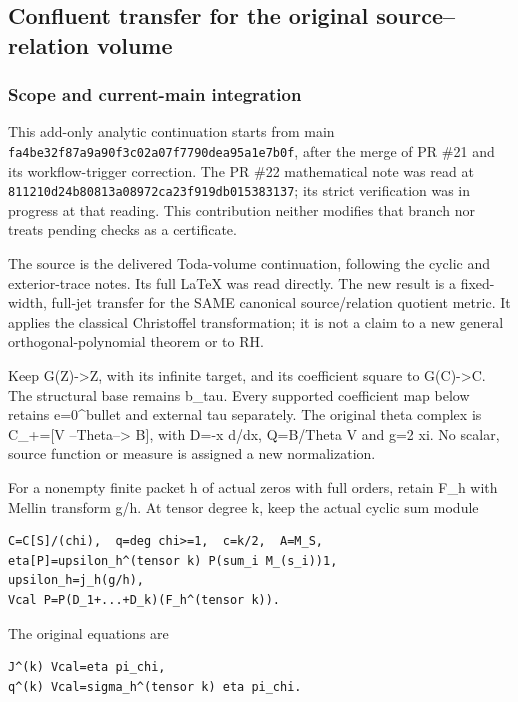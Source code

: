 \subsection{Confluent transfer for the original source--relation volume}\label{endpoint-pr24_original--confluent-transfer-for-the-original-sourcerelation-volume}

\subsubsection{Scope and current-main integration}\label{endpoint-pr24_original--scope-and-current-main-integration}

This add-only analytic continuation starts from main \nolinkurl{fa4be32f87a9a90f3c02a07f7790dea95a1e7b0f}, after the merge of PR \#21 and its workflow-trigger correction. The PR \#22 mathematical note was read at \nolinkurl{811210d24b80813a08972ca23f919db015383137}; its strict verification was in progress at that reading. This contribution neither modifies that branch nor treats pending checks as a certificate.

The source is the delivered Toda-volume continuation, following the cyclic and exterior-trace notes. Its full LaTeX was read directly. The new result is a fixed-width, full-jet transfer for the SAME canonical source/relation quotient metric. It applies the classical Christoffel transformation; it is not a claim to a new general orthogonal-polynomial theorem or to RH.

Keep G(Z)-\textgreater Z, with its infinite target, and its coefficient square to G(C)-\textgreater C. The structural base remains b\_tau. Every supported coefficient map below retains e=0\^{}bullet and external tau separately. The original theta complex is C\_+={[}V --Theta--\textgreater{} B{]}, with D=-x d/dx, Q=B/Theta V and g=2 xi. No scalar, source function or measure is assigned a new normalization.

For a nonempty finite packet h of actual zeros with full orders, retain F\_h with Mellin transform g/h. At tensor degree k, keep the actual cyclic sum module

\begin{verbatim}
C=C[S]/(chi),  q=deg chi>=1,  c=k/2,  A=M_S,
eta[P]=upsilon_h^(tensor k) P(sum_i M_(s_i))1,
upsilon_h=j_h(g/h),
Vcal P=P(D_1+...+D_k)(F_h^(tensor k)).
\end{verbatim}

The original equations are

\begin{verbatim}
J^(k) Vcal=eta pi_chi,
q^(k) Vcal=sigma_h^(tensor k) eta pi_chi.
\end{verbatim}

